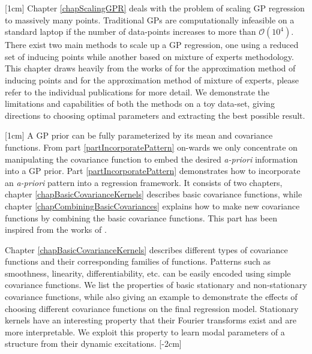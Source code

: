 [1cm]
Chapter \ref{chapScalingGPR} deals with the problem of scaling GP regression to massively many points. Traditional GPs are computationally infeasible on a standard laptop if the number of data-points increases to more than $\mathcal{O}(10^4)$. There exist two main methods to scale up a GP regression, one using a reduced set of inducing points while another based on mixture of experts methodology. This chapter draws heavily from the works of \cite{quinonero2005unifying, seeger2003fast, Snelson06sparsegaussian, Titsias09variationallearning} for the approximation method of inducing points and \cite{caoF14, tresp2000bayesian, chen2009bagging, deisenroth2015distributed} for the approximation method of mixture of experts, please refer to the individual publications for more detail. We demonstrate the limitations and capabilities of both the methods on a toy data-set, giving directions to choosing optimal parameters and extracting the best possible result.  

[1cm]
A GP prior can be fully parameterized by its mean and covariance functions. From part \ref{partIncorporatePattern} on-wards we only concentrate on manipulating the covariance function to embed the desired \textit{a-priori} information into a GP prior. Part \ref{partIncorporatePattern} demonstrates how to incorporate an \textit{a-priori} pattern into a regression framework. It consists of two chapters, chapter \ref{chapBasicCovarianceKernels} describes basic covariance functions, while chapter \ref{chapCombiningBasicCovariances} explains how to make new covariance functions by combining the basic covariance functions. This part has been inspired from the works of \cite{bishop2006pattern, mackay2003information, duvenaud-thesis-2014, wilson2014thesis, lloyd2014automatic, durrande2001etude, durrande2013anova}. 

Chapter \ref{chapBasicCovarianceKernels} describes different types of covariance functions and their corresponding families of functions. Patterns such as smoothness, linearity, differentiability, etc. can be easily encoded using simple covariance functions. We list the properties of basic stationary and non-stationary covariance functions, while also giving an example to demonstrate the effects of choosing different covariance functions on the final regression model. Stationary kernels have an interesting property that their Fourier transforms exist and are more interpretable. We exploit this property to learn modal parameters of a structure from their dynamic excitations. 
[-2cm]

